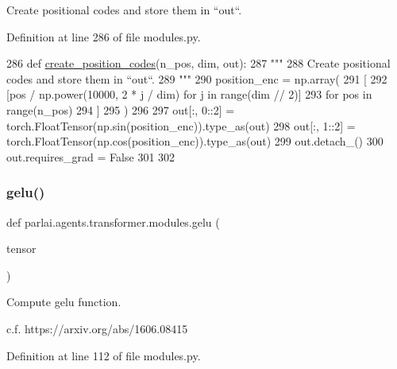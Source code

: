 \begin{DoxyVerb}Create positional codes and store them in ``out``.
\end{DoxyVerb}
 

Definition at line 286 of file modules.\+py.


\begin{DoxyCode}
286 \textcolor{keyword}{def }\hyperlink{namespaceparlai_1_1agents_1_1transformer_1_1modules_a0b86437e6e9682fa3100e9cadcaae259}{create\_position\_codes}(n\_pos, dim, out):
287     \textcolor{stringliteral}{"""}
288 \textcolor{stringliteral}{    Create positional codes and store them in ``out``.}
289 \textcolor{stringliteral}{    """}
290     position\_enc = np.array(
291         [
292             [pos / np.power(10000, 2 * j / dim) \textcolor{keywordflow}{for} j \textcolor{keywordflow}{in} range(dim // 2)]
293             \textcolor{keywordflow}{for} pos \textcolor{keywordflow}{in} range(n\_pos)
294         ]
295     )
296 
297     out[:, 0::2] = torch.FloatTensor(np.sin(position\_enc)).type\_as(out)
298     out[:, 1::2] = torch.FloatTensor(np.cos(position\_enc)).type\_as(out)
299     out.detach\_()
300     out.requires\_grad = \textcolor{keyword}{False}
301 
302 
\end{DoxyCode}
\mbox{\label{namespaceparlai_1_1agents_1_1transformer_1_1modules_ad93916b8d2188c35733089e1581c44f8}} 
\subsubsection{\texorpdfstring{gelu()}{gelu()}}
{\footnotesize\ttfamily def parlai.\+agents.\+transformer.\+modules.\+gelu (\begin{DoxyParamCaption}\item[{}]{tensor }\end{DoxyParamCaption})}

\begin{DoxyVerb}Compute gelu function.

c.f. https://arxiv.org/abs/1606.08415
\end{DoxyVerb}
 

Definition at line 112 of file modules.\+py.


